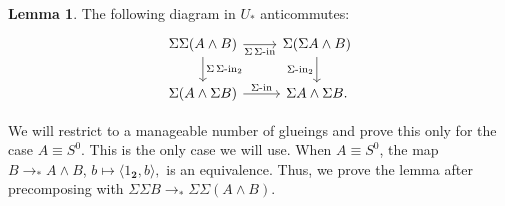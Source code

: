 \documentclass{amsart}
\theoremstyle{definition}
\newtheorem{lem}[theorem]{Lemma}
\newcommand{\pto}{\to_*}
\newcommand{\siin}{\operatorname{\Sigma-in}}
\newcommand{\s}{\mathbf{2}}
\begin{document}
\begin{lem}\label{le:siin-anticom}
    The following diagram in $U_*$ anticommutes:
    \[\begin{tikzcd}
    	{\Sigma \Sigma(A \wedge B)} & {\Sigma ( \Sigma A \wedge B)} \\
    	{\Sigma (A \wedge \Sigma B)} & {\Sigma A \wedge \Sigma B.}
    	\arrow["{\Sigma \siin}"', from=1-1, to=1-2]
    	\arrow["{\Sigma \siin_2}", from=1-1, to=2-1]
    	\arrow["{\siin_2}"', from=1-2, to=2-2]
    	\arrow["\siin", from=2-1, to=2-2]
    \end{tikzcd}\]
\end{lem}
We will restrict to a manageable number of glueings and prove this only for the case $A \equiv S^0$. This is the only case we will use. When $A \equiv S^0$, the map $B \pto A \wedge B$, $b \mapsto \langle 1_\s ,b \rangle,$ is an equivalence. Thus, we prove the lemma after precomposing with $\Sigma \Sigma B \pto \Sigma \Sigma (A \wedge B)$.
\end{document}

